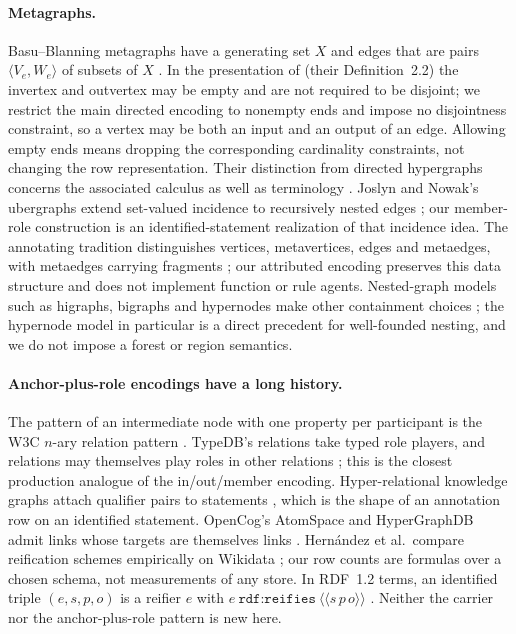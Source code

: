 \documentclass[11pt]{article}
\theoremstyle{plain}
\theoremstyle{definition}
\theoremstyle{remark}
\begin{document}
\paragraph{Metagraphs.}
Basu--Blanning metagraphs have a generating set $X$ and edges that are pairs
$\langle V_e,W_e\rangle$ of subsets of $X$ \cite{basu1994metagraphs,basu2007metagraphs}.
In the presentation of \citet{parsonage2025tpp} (their Definition~2.2) the invertex and
outvertex may be empty and are not required to be disjoint; we restrict the main
directed encoding to nonempty ends and impose no disjointness constraint, so a vertex
may be both an input and an output of an edge. Allowing empty ends means dropping
the corresponding cardinality constraints, not changing the row representation.
Their distinction from directed hypergraphs concerns the associated calculus as well as
terminology \cite{gallo1993directed,parsonage2025tpp}. Joslyn and Nowak's ubergraphs extend
set-valued incidence to recursively nested edges
\cite{joslyn2017ubergraphs}; our member-role construction is an identified-statement
realization of that incidence idea. The annotating tradition distinguishes vertices,
metavertices, edges and metaedges, with metaedges carrying fragments
\cite{chernenkiy2017metagraph,gapanyuk2021development}; our attributed encoding preserves
this data structure and does not implement function or rule agents. Nested-graph
models such as higraphs, bigraphs and hypernodes make other containment choices
\cite{harel1988higraphs,milner2009bigraphs,poulovassilis1994nested}; the hypernode
model in particular is a direct precedent for well-founded nesting, and we do not impose
a forest or region semantics.

\paragraph{Anchor-plus-role encodings have a long history.}
The pattern of an intermediate node with one property per participant is the W3C
$n$-ary relation pattern \cite{noy2006nary}. TypeDB's relations take typed role players,
and relations may themselves play roles in other relations \cite{typedb2026datamodel}; this is the
closest production analogue of the in/out/member encoding. Hyper-relational knowledge
graphs attach qualifier pairs to statements \cite{galkin2020stare}, which is the shape
of an annotation row on an identified statement. OpenCog's AtomSpace and HyperGraphDB
admit links whose targets are themselves links
\cite{goertzel2014opencog,iordanov2010hypergraphdb}. Hern{\'a}ndez et al.\
compare reification schemes empirically on Wikidata \cite{hernandez2015reifying}; our
row counts are formulas over a chosen schema, not measurements of any store.
In RDF~1.2 terms, an identified triple $(e,s,p,o)$ is a reifier $e$ with
$e\ \texttt{rdf:reifies}\ \langle\!\langle s\,p\,o\rangle\!\rangle$ \cite{w3c2026rdf12concepts}.
Neither the carrier nor the anchor-plus-role pattern is new here.
\end{document}
